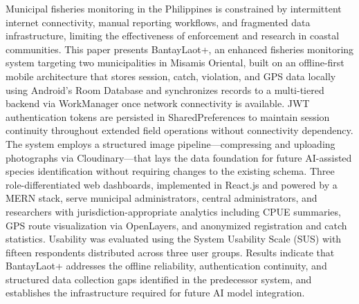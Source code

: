 \documentclass{icsthesis}
\begin{document}
\begin{frontmatter}
\begin{abstractwithpageno}
        Municipal fisheries monitoring in the Philippines is constrained by intermittent
        internet connectivity, manual reporting workflows, and fragmented data infrastructure,
        limiting the effectiveness of enforcement and research in coastal communities.
        This paper presents BantayLaot+, an enhanced fisheries monitoring system targeting two
        municipalities in Misamis Oriental, built on an offline-first mobile architecture that
        stores session, catch, violation, and GPS data locally using Android's Room Database and
        synchronizes records to a multi-tiered backend via WorkManager once network connectivity
        is available. JWT authentication tokens are persisted in SharedPreferences to maintain
        session continuity throughout extended field operations without connectivity dependency.
        The system employs a structured image pipeline---compressing and uploading photographs
        via Cloudinary---that lays the data foundation for future AI-assisted species
        identification without requiring changes to the existing schema. Three
        role-differentiated web dashboards, implemented in React.js and powered by a MERN
        stack, serve municipal administrators, central administrators, and researchers with
        jurisdiction-appropriate analytics including CPUE summaries, GPS route visualization
        via OpenLayers, and anonymized registration and catch statistics. Usability was
        evaluated using the System Usability Scale (SUS) with fifteen respondents distributed
        across three user groups. Results indicate that BantayLaot+ addresses the offline
        reliability, authentication continuity, and structured data collection gaps identified
        in the predecessor system, and establishes the infrastructure required for future
        AI model integration.
		\end{abstractwithpageno}

	\end{frontmatter}
	
\end{document}
